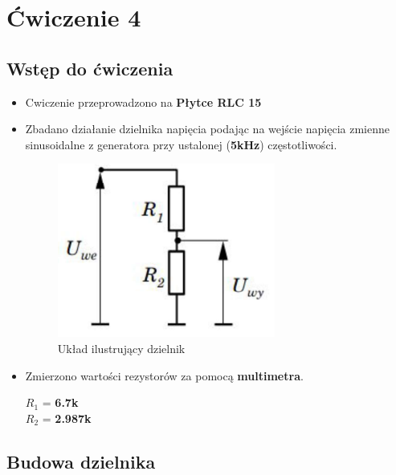 \chapter{Ćwiczenie 4}

\section{Wstęp do ćwiczenia}

\begin{itemize}
    \item Cwiczenie przeprowadzono na \textbf{Płytce RLC 15}
    \item Zbadano działanie dzielnika napięcia podając na wejście napięcia zmienne sinusoidalne z generatora przy ustalonej (\textbf{5kHz}) częstotliwości.
    \begin{figure}[h]
        \centering
        \includegraphics[scale=3]{images/dzielnik.png}
        \caption{Układ ilustrujący dzielnik}
        \label{fig:dzielnik}
    \end{figure}
    \item Zmierzono wartości rezystorów za pomocą \textbf{multimetra}.
    \begin{center}
        $R_1$ = \textbf{6.7k}\boldsymbol{\Omega} \\
        $R_2$ = \textbf{2.987k}\boldsymbol{\Omega}
    \end{center}
\end{itemize}

\section{Budowa dzielnika}

